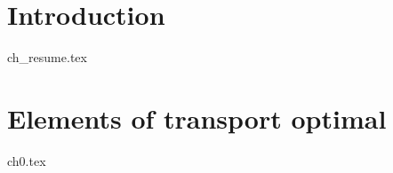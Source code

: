 \documentclass{Classe/Dissertate}
\begin{document}
 \setcounter{page}{1}
 

%


    \lab
    
    
        

~\newpage
\vspace{0.1cm}


~\newpage


~\newpage



    \tableofcontents
     
    \clearpage
    
    \OddChapter%
    
	\setcounter{page}{1}
    \restoregeometry
    
\renewcommand{\contentsname}{}
\setcounter{tocdepth}{3}
\addtocounter{chapter}{0}


\ChangeColor%
\chapter{Introduction}
\LocalTOC%
{ch_resume.tex}
\OddChapter%
\clearpage


\ChangeColor%
\chapter{Elements of transport optimal}
\LocalTOC%
{ch0.tex}
\OddChapter%
\clearpage


%
%
\end{document}
